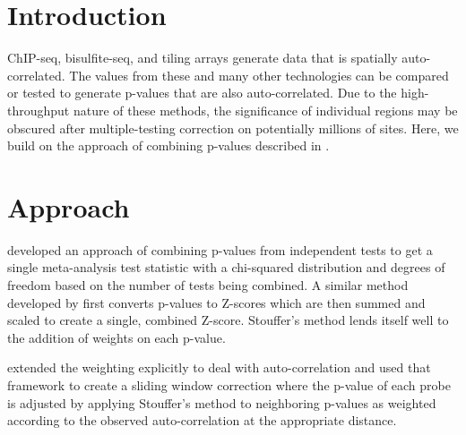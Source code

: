 \documentclass{bioinfo}
\begin{document}
\section{Introduction}
ChIP-seq, bisulfite-seq, and tiling arrays generate data that is spatially
auto-correlated. The values from these and many other technologies can be
compared or tested to generate p-values that are also auto-correlated. Due to the
high-throughput nature of these methods, the significance of individual regions
may be obscured after multiple-testing correction on potentially millions of sites.
Here, we build on the approach of combining p-values described in \citep{Kechris2010}.

\section{Approach}

\citep{Fisher} developed an approach of combining p-values from independent tests
to get a single meta-analysis test statistic with a chi-squared distribution 
and degrees of freedom based on the number of tests being combined.
A similar method developed by \citep{Stouffer} first converts p-values
to Z-scores which are then summed and scaled to create a single, combined Z-score.
Stouffer's method lends itself well to the addition of weights on each p-value.

\citep{Zaykin} extended the weighting explicitly to deal with auto-correlation and
\citep{Kechris2010} used that framework to create a sliding window correction where
the p-value of each probe is adjusted by applying Stouffer's method to neighboring
p-values as weighted according to the observed auto-correlation at the appropriate
distance.
\end{document}
